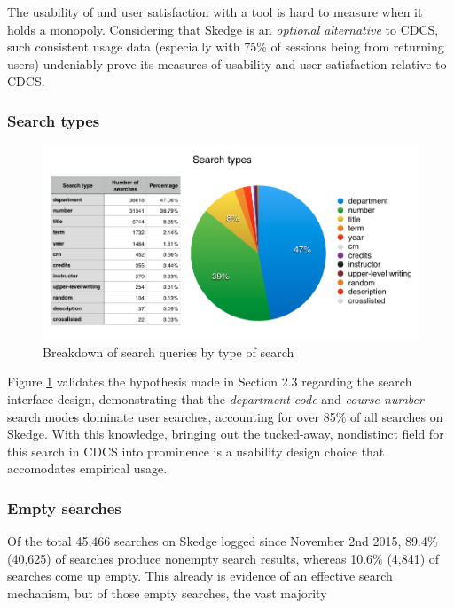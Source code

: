 The usability of and user satisfaction with a tool is hard to measure when it holds a monopoly. Considering that Skedge is an \emph{optional alternative} to CDCS, such consistent usage data (especially with 75\% of sessions being from returning users) undeniably prove its measures of usability and user satisfaction relative to CDCS.


  \subsubsection{Search types}

  \begin{figure}[H]
    \centering
    \includegraphics[width=1.0\textwidth]{images/graph/searchtypes}

    \caption{Breakdown of search queries by type of search}
    \label{fig:searchtypes}
  \end{figure}


Figure \ref{fig:searchtypes} validates the hypothesis made in Section 2.3 regarding the search interface design, demonstrating that the \emph{department code} and \emph{course number} search modes dominate user searches, accounting for over 85\% of all searches on Skedge. With this knowledge, bringing out the tucked-away, nondistinct field for this search in CDCS into prominence is a usability design choice that accomodates empirical usage.

\subsubsection{Empty searches}

  Of the total 45,466 searches on Skedge logged since November 2nd 2015, 89.4\% (40,625) of searches produce nonempty search results, whereas 10.6\% (4,841) of searches come up empty. This already is evidence of an effective search mechanism, but of those empty searches, the vast majority

